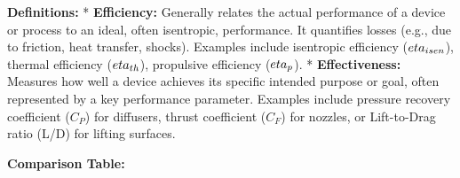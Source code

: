 \textbf{Definitions:} * \textbf{Efficiency:} Generally relates the
actual performance of a device or process to an ideal, often isentropic,
performance. It quantifies losses (e.g., due to friction, heat transfer,
shocks). Examples include isentropic efficiency (\(\\eta_{isen}\)),
thermal efficiency (\(\\eta_{th}\)), propulsive efficiency
(\(\\eta_p\)). * \textbf{Effectiveness:} Measures how well a device
achieves its specific intended purpose or goal, often represented by a
key performance parameter. Examples include pressure recovery
coefficient (\(C_P\)) for diffusers, thrust coefficient (\(C_F\)) for
nozzles, or Lift-to-Drag ratio (L/D) for lifting surfaces.

\textbf{Comparison Table:}

